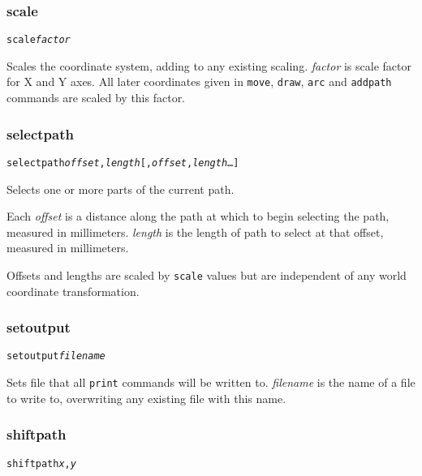 \subsubsection{scale}

\begin{alltt}
scale \textit{factor}
\end{alltt}

Scales the coordinate system, adding to any existing scaling.  \textit{factor}
is scale factor for X and Y axes.  All later coordinates given in
\texttt{move}, \texttt{draw}, \texttt{arc} and \texttt{addpath} commands are
scaled by this factor.

\subsubsection{selectpath}

\begin{alltt}
selectpath \textit{offset}, \textit{length} [, \textit{offset}, \textit{length}  \dots ]
\end{alltt}

Selects one or more parts of the current path.

Each \textit{offset} is a distance along the path at which to begin selecting
the path, measured in millimeters.
\textit{length} is the length of path to select at that offset, measured
in millimeters.

Offsets and lengths are scaled by \texttt{scale} values but are independent of
any world coordinate transformation.

\subsubsection{setoutput}

\begin{alltt}
setoutput \textit{filename}
\end{alltt}

Sets file that all \texttt{print} commands will be written to.
\textit{filename} is the name of a file to write to, overwriting any
existing file with this name.

\subsubsection{shiftpath}

\begin{alltt}
shiftpath \textit{x}, \textit{y}
\end{alltt}

